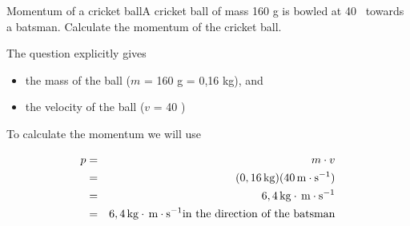 \begin{wex}{Momentum of a cricket ball}{A cricket ball of mass 160 g is bowled at 40 \ms\ towards a batsman. Calculate the momentum of the cricket ball.}{
The question explicitly gives
\begin{itemize}
\item the mass of the ball ($m$ = 160 g = 0,16 kg), and
\item the velocity of the ball ($v$ = 40 \ms)
\end{itemize}
To calculate the momentum we will use 

\begin{eqnarray*}
p&=& m \cdot v \\
&=& (0,16 \,\mathrm{kg})(40 \,\mathrm{m \cdot s^{-1}})\\
&=& 6,4\,\mathrm{kg} \cdot \,\mathrm{m \cdot s^{-1}} \\
&=& 6,4\,\mathrm{kg} \cdot \,\mathrm{m \cdot s^{-1}} \mbox{in the direction of the batsman}
\end{eqnarray*}
}
\end{wex}

